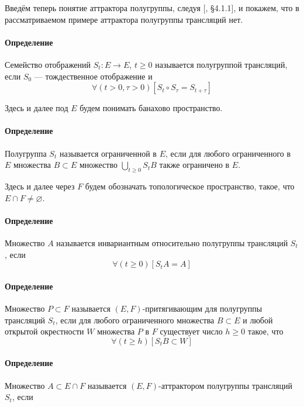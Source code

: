Введём теперь понятие аттрактора полугруппы, следуя [\cite{Vorotnikov}, \S 4.1.1],
и покажем, что в рассматриваемом примере аттрактора полугруппы трансляций нет.

\paragraph{Определение}

Семейство отображений $S_t : E \to E$, $t \geq 0$ называется полугруппой трансляций,
если $S_0$ --- тождественное отображение и
$$
	\forall(t>0,\tau>0)[S_t \circ S_\tau = S_{t+\tau}]
$$

Здесь и далее под $E$ будем понимать банахово пространство.

\paragraph{Определение}

Полугруппа $S_t$ называется ограниченной в $E$, если для любого ограниченного в $E$ множества $B \subset E$ множество $\bigcup\limits_{t\geq0}S_t B$ также ограничено в $E$.

Здесь и далее через $F$ будем обозначать топологическое пространство, такое, что $E \cap F \ne \varnothing$.

\paragraph{Определение}

Множество $A$ называется инвариантным относительно полугруппы трансляций $S_t$, если
$$
	\forall(t\geq 0)[S_t A = A]
$$

\paragraph{Определение}

Множество $P \subset F$ называется $(E,F)$-притягивающим для полугруппы трансляций $S_t$,
если для любого ограниченного множества $B \subset E$ и любой открытой окрестности $W$ множества $P$ в $F$ существует число $h\geq 0$ такое, что
$$
	\forall(t \geq h)[S_t B \subset W]
$$


\paragraph{Определение}

Множество $A\subset E\cap F$ называется $(E,F)$-аттрактором полугруппы трансляций $S_t$, если

